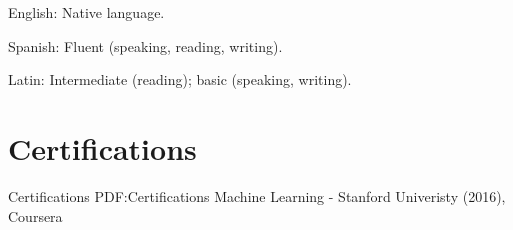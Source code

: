 \documentclass[letterpaper,10pt,oneside]{article}
\newcommand{\CVNote}{CV updated on {\DatestampYM{2021}{05}} }
\begin{document}
\begin{body}
\BulletItem
English: Native language.

\GapNoBreak
\BulletItem
Spanish: Fluent (speaking, reading, writing).

\GapNoBreak
\BulletItem
Latin: Intermediate (reading); basic (speaking, writing).
\fi



\section
{Certifications}
{Certifications}
{PDF:Certifications}
Machine Learning - Stanford Univeristy (2016), Coursera
\GapNoBreak





\iffalse
\section
{References}
{References}
{PDF:References}

\BulletItem
\textbf{Ke Zhou}
\newline
Professor
\newline
School of Computer Science and Technology
\newline
Huazhong University of Science and Technology
\begin{detail}
\SubBulletItem
{k.zhou@hust.edu.cn}
\,\SubBulletSymbol\,
+86\,139-7107-5916
\end{detail}
\fi

\end{body}



\label{LastPage}~
\end{document}
